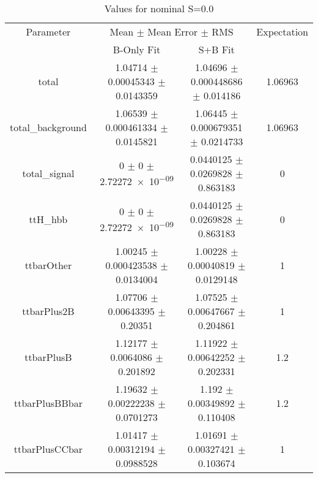 \begin{table}
\centering
\caption{Values for nominal S=0.0}
\begin{tabular}{cccc}
\toprule
Parameter & \multicolumn{2}{c}{Mean $\pm$ Mean Error $\pm$ RMS} & Expectation\\
 & B-Only Fit & S+B Fit & \\
\midrule
total & \num{1.04714} $\pm$ \num{0.00045343} $\pm$ \num{0.0143359} & \num{1.04696} $\pm$ \num{0.000448686} $\pm$ \num{0.014186} & \num{1.06963}\\
total\_background & \num{1.06539} $\pm$ \num{0.000461334} $\pm$ \num{0.0145821} & \num{1.06445} $\pm$ \num{0.000679351} $\pm$ \num{0.0214733} & \num{1.06963}\\
total\_signal & \num{0} $\pm$ \num{0} $\pm$ \num{2.72272e-09} & \num{0.0440125} $\pm$ \num{0.0269828} $\pm$ \num{0.863183} & \num{0}\\
ttH\_hbb & \num{0} $\pm$ \num{0} $\pm$ \num{2.72272e-09} & \num{0.0440125} $\pm$ \num{0.0269828} $\pm$ \num{0.863183} & \num{0}\\
ttbarOther & \num{1.00245} $\pm$ \num{0.000423538} $\pm$ \num{0.0134004} & \num{1.00228} $\pm$ \num{0.00040819} $\pm$ \num{0.0129148} & \num{1}\\
ttbarPlus2B & \num{1.07706} $\pm$ \num{0.00643395} $\pm$ \num{0.20351} & \num{1.07525} $\pm$ \num{0.00647667} $\pm$ \num{0.204861} & \num{1}\\
ttbarPlusB & \num{1.12177} $\pm$ \num{0.0064086} $\pm$ \num{0.201892} & \num{1.11922} $\pm$ \num{0.00642252} $\pm$ \num{0.202331} & \num{1.2}\\
ttbarPlusBBbar & \num{1.19632} $\pm$ \num{0.00222238} $\pm$ \num{0.0701273} & \num{1.192} $\pm$ \num{0.00349892} $\pm$ \num{0.110408} & \num{1.2}\\
ttbarPlusCCbar & \num{1.01417} $\pm$ \num{0.00312194} $\pm$ \num{0.0988528} & \num{1.01691} $\pm$ \num{0.00327421} $\pm$ \num{0.103674} & \num{1}\\
\bottomrule
\end{tabular}
\end{table}